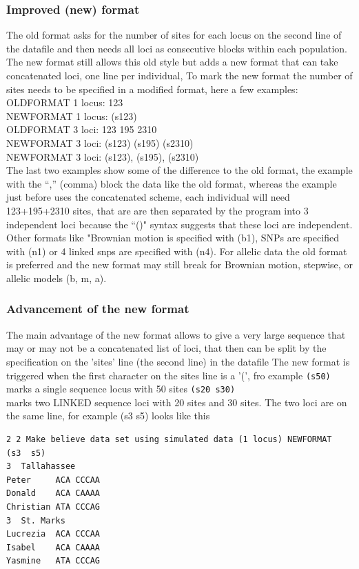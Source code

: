 \subsubsection*{Improved (new) format}
The old format asks for the number of sites for each locus on the second line of the datafile and then needs all loci as consecutive blocks within each population. The new format still allows this old style but adds a new format that can take concatenated loci, one line per individual, To mark the new format the number of sites needs to be specified in a modified format, here a few examples:
\startformatted
OLDFORMAT 1 locus:    123\\
NEWFORMAT 1 locus:   (s123)\\ 
OLDFORMAT 3 loci:    123 195 2310\\
NEWFORMAT 3 loci:   (s123) (s195) (s2310)\\
NEWFORMAT 3 loci:   (s123), (s195), (s2310)\\
\endformatted
The last two examples show some of the difference to the old format, the example with the ``,'' (comma) block the data like the old format, whereas the example just before uses the concatenated scheme, each individual will need 123+195+2310 sites, that are are then separated by the program into 3 independent loci because the ``()" syntax suggests that these loci are independent. Other formats like "Brownian motion is specified with (b1), SNPs are specified with (n1) or 4 linked snps are specified with (n4). For allelic data the old format is preferred and the new format may still break for Brownian motion, stepwise, or allelic models (b, m, a). 
\subsubsection*{Advancement of the new format}
The main advantage of the new format allows to give a very large sequence that may or may not be a concatenated list of loci,
that then can be split by the specification on the 'sites' line (the second line) in the datafile
The new format is triggered when the first character on the sites line is a '(', fro example
\texttt{(s50)}\\
marks a single sequence locus with 50 sites
\texttt{(s20 s30)}\\
marks two LINKED sequence loci with 20 sites and 30 sites. The two loci are on the same line, for example (s3 s5) looks like this
\begin{flushleft}
\begin{small}
\begin{tt}
\begin{verbatim}
2 2 Make believe data set using simulated data (1 locus) NEWFORMAT
(s3  s5) 
3  Tallahassee 
Peter     ACA CCCAA
Donald    ACA CAAAA
Christian ATA CCCAG
3  St. Marks 
Lucrezia  ACA CCCAA
Isabel    ACA CAAAA
Yasmine   ATA CCCAG
\end{verbatim}
\end{tt}
\end{small}
\end{flushleft}

